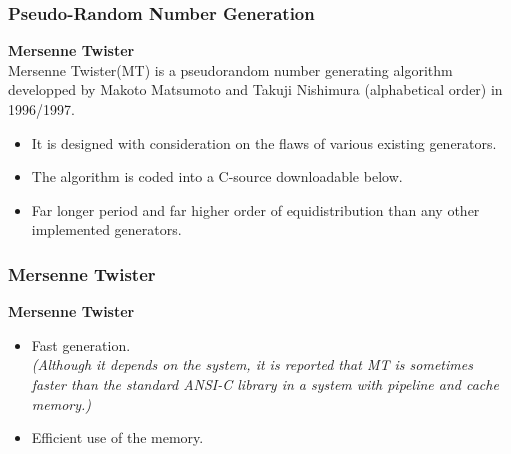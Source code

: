 \documentclass[MAIN.tex]{subfiles}
\begin{document}
\begin{frame}[fragile]
	\frametitle{Pseudo-Random Number Generation}
\textbf{Mersenne Twister}\\
Mersenne Twister(MT) is a pseudorandom number generating algorithm developped by Makoto Matsumoto and Takuji Nishimura (alphabetical order) in 1996/1997. 

\begin{itemize}
	\item It is designed with consideration on the flaws of various existing generators.
	\item The algorithm is coded into a C-source downloadable below.
	\item Far longer period and far higher order of equidistribution than any other implemented generators. 
\end{itemize}
\end{frame}

\begin{frame}
	
	\frametitle{Mersenne Twister}
\textbf{Mersenne Twister}\\
\begin{itemize}
\item Fast generation. \\ \textit{(Although it depends on the system, it is reported that MT is sometimes faster than the standard ANSI-C library in a system with pipeline and cache memory.)}
\item Efficient use of the memory. 
\end{itemize}	
\end{frame}
\end{document}
